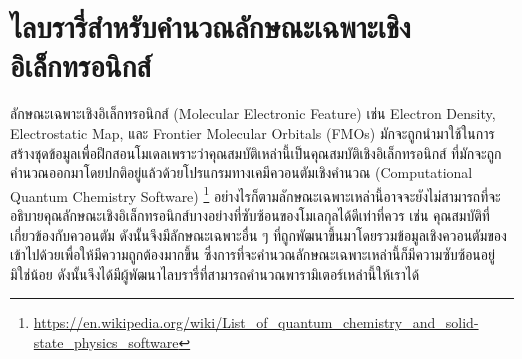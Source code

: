 \section{ไลบรารี่สำหรับคำนวณลักษณะเฉพาะเชิงอิเล็กทรอนิกส์}
\label{sec:lib_elec_feat}

ลักษณะเฉพาะเชิงอิเล็กทรอนิกส์ (Molecular Electronic Feature) เช่น Electron Density, Electrostatic Map, และ Frontier 
Molecular Orbitals (FMOs) มักจะถูกนำมาใช้ในการสร้างชุดข้อมูลเพื่อฝึกสอนโมเดลเพราะว่าคุณสมบัติเหล่านี้เป็นคุณสมบัติเชิงอิเล็กทรอนิกส์%
ที่มักจะถูกคำนวณออกมาโดยปกติอยู่แล้วด้วยโปรแกรมทางเคมีควอนตัมเชิงคำนวณ (Computational Quantum Chemistry Software)%
\footnote{\url{https://en.wikipedia.org/wiki/List_of_quantum_chemistry_and_solid-state_physics_software}}
อย่างไรก็ตามลักษณะเฉพาะเหล่านี้อาจจะยังไม่สามารถที่จะอธิบายคุณลักษณะเชิงอิเล็กทรอนิกส์บางอย่างที่ซับซ้อนของโมเลกุลได้ดีเท่าที่ควร เช่น 
คุณสมบัติที่เกี่ยวข้องกับควอนตัม ดังนั้นจึงมีลักษณะเฉพาะอื่น ๆ ที่ถูกพัฒนาขึ้นมาโดยรวมข้อมูลเชิงควอนตัมของเข้าไปด้วยเพื่อให้มีความถูกต้องมากขึ้น 
ซึ่งการที่จะคำนวณลักษณะเฉพาะเหล่านี้ก็มีความซับซ้อนอยู่มิใช่น้อย ดังนั้นจึงได้มีผู้พัฒนาไลบรารี่ที่สามารถคำนวณพารามิเตอร์เหล่านี้ให้เราได้

